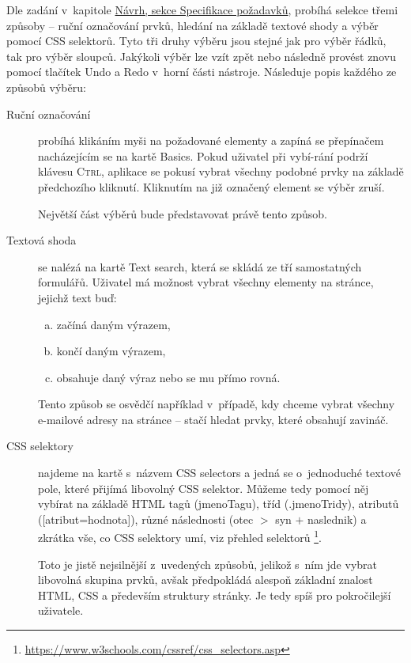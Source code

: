 \documentclass[thesis=B,czech]{FITthesis}[2012/06/26]
\begin{document}
Dle zadání v~kapitole \hyperref[sec:requirements_specification]{Návrh, sekce Specifikace požadavků}, probíhá selekce třemi způsoby -- ruční označování prvků, hledání na základě textové shody a výběr pomocí CSS selektorů. Tyto tři druhy výběru jsou stejné jak pro výběr řádků, tak pro výběr sloupců. Jakýkoli výběr lze vzít zpět nebo následně provést znovu pomocí tlačítek \textsf{Undo} a \textsf{Redo} v~horní části nástroje. Následuje popis každého ze způsobů výběru:
\begin{description}
	\item[Ruční označování] probíhá klikáním myši na požadované elementy a zapíná se přepínačem nacházejícím se na kartě \textsf{Basics}. Pokud uživatel při vybí-rání podrží klávesu \textsc{Ctrl}, aplikace se pokusí vybrat všechny podobné prvky na základě předchozího kliknutí. Kliknutím na již označený element se výběr zruší.
	
	Největší část výběrů bude představovat právě tento způsob.
	
	\item [Textová shoda] se nalézá na kartě \textsf{Text search}, která se skládá ze tří samostatných formulářů. Uživatel má možnost vybrat všechny elementy na stránce, jejichž text buď:
	\begin{enumerate}[a)]
		\item začíná daným výrazem,
		\item končí daným výrazem,
		\item obsahuje daný výraz nebo se mu přímo rovná.
	\end{enumerate}
	Tento způsob se osvědčí například v~případě, kdy chceme vybrat všechny e-mailové adresy na stránce -- stačí hledat prvky, které obsahují zavináč.
	\item [CSS selektory] najdeme na kartě s~názvem \textsf{CSS selectors} a jedná se o~jednoduché textové pole, které přijímá libovolný CSS selektor. Můžeme tedy pomocí něj vybírat na základě HTML tagů (\textsf{jmenoTagu}), tříd (\textsf{.jmenoTridy}), atributů (\textsf{[atribut=hodnota]}), různé následnosti (\textsf{otec $>$ syn $+$ naslednik}) a zkrátka vše, co CSS selektory umí, viz přehled selektorů \footnote{\url{https://www.w3schools.com/cssref/css_selectors.asp}}.
	
	Toto je jistě nejsilnější z~uvedených způsobů, jelikož s~ním jde vybrat libovolná skupina prvků, avšak předpokládá alespoň základní znalost HTML, CSS a především struktury stránky. Je tedy spíš pro pokročilejší uživatele.
\end{description}
\end{document}
